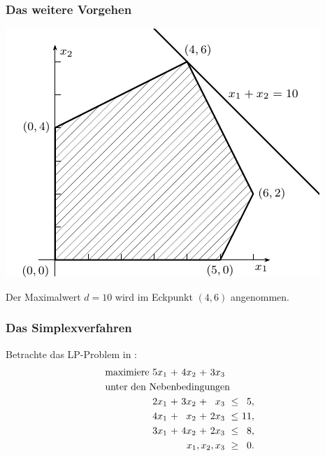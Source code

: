 \documentclass[smaller]{beamer}
\begin{document}
\begin{frame}
 \frametitle{Das weitere Vorgehen}
 \begin{center}
\includegraphics{fig4.pdf}
\end{center}
Der Maximalwert $d = 10$ wird im Eckpunkt $(4, 6)$ angenommen.
\end{frame}

\begin{frame}
 \frametitle{Das Simplexverfahren}
 Betrachte das LP-Problem in :
\begin{align}
\begin{alignedat}{5}
\label{eq:2:1}
& \text{maximiere } & 5x_1 &\ + &\ 4x_2 &\ + &\ 3x_3 & & \\
& \rlap{unter den Nebenbedingungen} & & & & & & & \\
&& 2x_1 &\ + &\ 3x_2 &\ + &\  x_3 &\ \leq &\  5,\ \\
&& 4x_1 &\ + &\  x_2 &\ + &\ 2x_3 &\ \leq &\ 11,\ \\
&& 3x_1 &\ + &\ 4x_2 &\ + &\ 2x_3 &\ \leq &\  8,\ \\
&& & & & & \llap{$x_1, x_2, x_3$} &\ \geq &\  0.\
\end{alignedat}
\end{align}
\end{frame}
\end{document}
